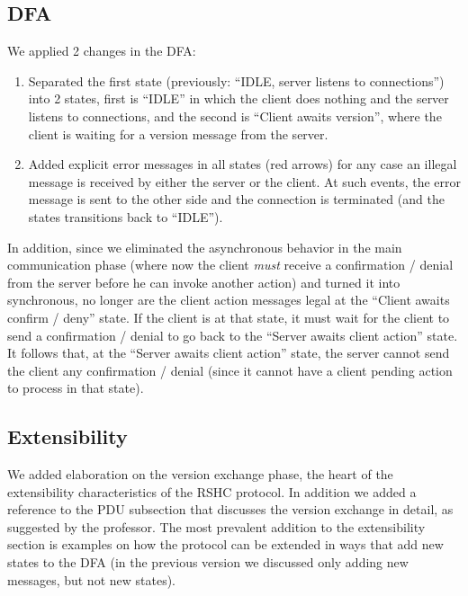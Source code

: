 \subsection{DFA}
We applied 2 changes in the DFA:
\begin{enumerate}
\item Separated the first state (previously: ``IDLE, server listens to connections'') into 2 states, first is ``IDLE'' in which the client does nothing and the server listens to connections, and the second is ``Client awaits version'', where the client is waiting for a version message from the server.
\item Added explicit error messages in all states (red arrows) for any case an illegal message is received by either the server or the client. At such events, the error message is sent to the other side and the connection is terminated (and the states transitions back to ``IDLE'').
\end{enumerate}

In addition, since we eliminated the asynchronous behavior in the main communication phase (where now the client {\em must} receive a confirmation / denial from the server before he can invoke another action) and turned it into synchronous, no longer are the client action messages legal at the ``Client awaits confirm / deny'' state. If the client is at that state, it must wait for the client to send a confirmation / denial to go back to the ``Server awaits client action'' state. It follows that, at the ``Server awaits client action'' state, the server cannot send the client any confirmation / denial (since it cannot have a client pending action to process in that state).

\subsection{Extensibility}
We added elaboration on the version exchange phase, the heart of the extensibility characteristics of the RSHC protocol. In addition we added a reference to the PDU subsection that discusses the version exchange in detail, as suggested by the professor. The most prevalent addition to the extensibility section is examples on how the protocol can be extended in ways that add new states to the DFA (in the previous version we discussed only adding new messages, but not new states).


